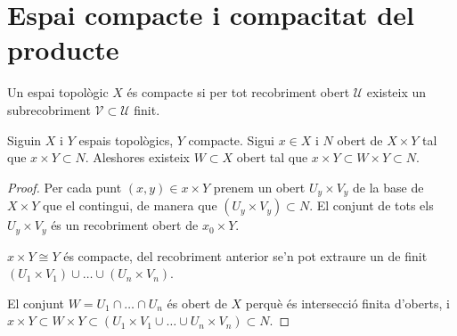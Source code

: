 \section{Espai compacte i compacitat del producte}

\begin{defi}
    Un espai topològic $X$ és compacte si per tot recobriment obert $\mathscr{U}$ existeix un subrecobriment $\mathscr{V}\subset\mathscr{U}$ finit.
\end{defi}

\begin{lema}
    Siguin $X$ i $Y$ espais topològics, $Y$ compacte. Sigui $x\in X$ i $N$ obert de $X \times Y$ tal que $x\times Y \subset N$.
    Aleshores existeix $W \subset X$ obert tal que $x\times Y \subset W \times Y \subset N$.
\end{lema}
\begin{proof}
    Per cada punt $(x,y) \in x\times Y$ prenem un obert $U_y\times V_y$ de la base de $X\times Y$ que el contingui, de manera que $(U_y\times V_y) \subset N$. El conjunt de tots els $U_y\times V_y$ és un recobriment obert de $x_0\times Y$.
    
    $x \times Y \cong Y$ és compacte, del recobriment anterior se'n pot extraure un de finit $(U_1 \times V_1) \cup\dots\cup (U_n \times V_n)$.
    
    El conjunt $W = U_1 \cap\dots\cap U_n$ és obert de $X$ perquè és intersecció finita d'oberts, i $x \times Y \subset W\times Y \subset (U_1 \times V_1 \cup\dots\cup U_n \times V_n) \subset N$.
\end{proof}

